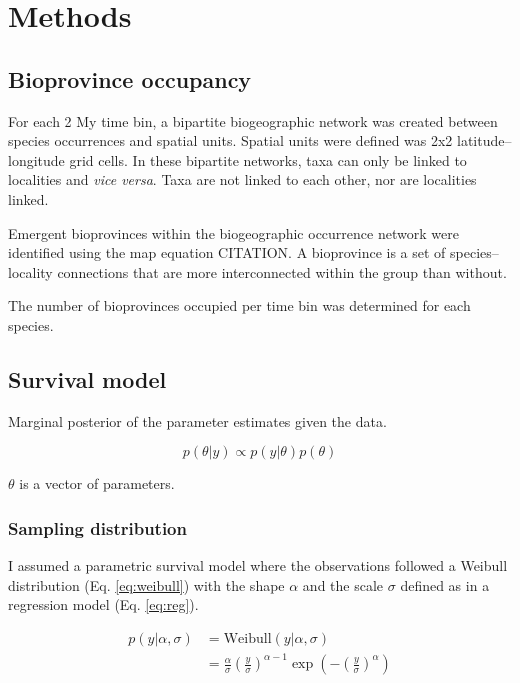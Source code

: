 \documentclass[12pt,letterpaper]{article}
\begin{document}
\section{Methods}

\subsection{Bioprovince occupancy}

For each 2 My time bin, a bipartite biogeographic network was created between species occurrences and spatial units. Spatial units were defined was 2x2 latitude--longitude grid cells. In these bipartite networks, taxa can only be linked to localities and \textit{vice versa}. Taxa are not linked to each other, nor are localities linked. 

Emergent bioprovinces within the biogeographic occurrence network were identified using the map equation CITATION. A bioprovince is a set of species--locality connections that are more interconnected within the group than without. 

The number of bioprovinces occupied per time bin was determined for each species.


\subsection{Survival model}

Marginal posterior of the parameter estimates given the data.

\begin{equation}
  p(\theta|y) \propto p(y|\theta) p(\theta)
  \label{eq:bayes}
\end{equation}

\(\theta\) is a vector of parameters.

\subsubsection{Sampling distribution}

I assumed a parametric survival model where the observations followed a Weibull distribution (Eq. \ref{eq:weibull}) with the shape \(\alpha\) and the scale \(\sigma\) defined as in a regression model (Eq. \ref{eq:reg}).

\begin{align}
  p(y|\alpha, \sigma) &= \mathrm{Weibull}(y|\alpha, \sigma) \nonumber \\ 
  &= \frac{\alpha}{\sigma} \left(\frac{y}{\sigma}\right)^{\alpha - 1} \exp\left(-\left(\frac{y}{\sigma}\right)^{\alpha}\right)
  \label{eq:weibull}
\end{align}
\end{document}
